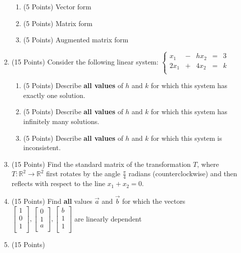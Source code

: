 \documentclass[12pt]{article}
\begin{document}
\begin{enumerate}
\begin{enumerate}
		\item (5 Points) Vector form
		\item (5 Points) Matrix form 
		\item (5 Points) Augmented matrix form
	\end{enumerate}
	\item (15 Points) Consider the following linear system: 
		$\left\{\begin{array}{rrrrr}
			x_1&-&hx_2&=&3\\
			2x_1&+&4x_2&=&k\\
		\end{array}\right.$
	\begin{enumerate}
		\item (5 Points) Describe \textbf{all values} of $h$ and $k$ for which this system has exactly one solution.	
		\item (5 Points) Describe \textbf{all values} of $h$ and $k$ for which this system has infinitely many solutions.
		\item (5 Points) Describe \textbf{all values} of $h$ and $k$ for which this system is inconsistent.
	\end{enumerate}
	\item (15 Points) Find the standard matrix of the transformation $T$, where $T : \mathbb{R}^2 \longrightarrow
	\mathbb{R}^2$ first rotates by the angle $\frac{\pi}{4}$ radians (counterclockwise) 
	and then reflects with respect to the line $x_1 + x_2 = 0$.
	\item (15 Points) Find \textbf{all} values $\vec{a}$ and $\vec{b}$ for which the vectors 
		$\left[ \begin{array}{r}
			1\\
			0\\
			1\\
		\end{array}\right],
		\left[ \begin{array}{r}
			0\\
			1\\
			a\\
		\end{array}\right],
		\left[ \begin{array}{r}
			b\\
			1\\
			1\\
		\end{array}\right]$ are linearly dependent
	\item (15 Points)

\end{enumerate}
\end{document}
